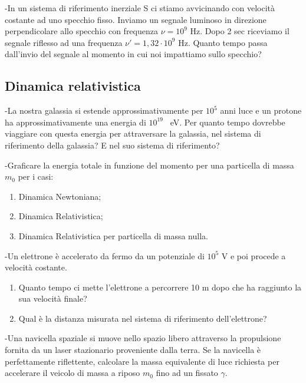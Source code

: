 \documentclass[12pt,twoside,a4]{article}
\begin{document}
\begin{esercizio}
	-In un sistema di riferimento inerziale S ci stiamo avvicinando con velocità  costante ad uno specchio fisso. Inviamo un segnale luminoso in direzione perpendicolare allo specchio con frequenza $\nu = 10^9$ Hz. Dopo 2 sec riceviamo il segnale riflesso ad una frequenza $\nu'=1,32 \cdot 10^9$ Hz. Quanto tempo passa dall'invio del segnale al momento in cui noi impattiamo sullo specchio?
\end{esercizio}

\newpage
\subsection{Dinamica relativistica}

\begin{esercizio}
	-La nostra galassia si estende approssimativamente per $10^5$ anni luce e un protone ha approssimativamente una energia di $10^{19}$ \ eV. Per quanto tempo dovrebbe viaggiare con questa energia per attraversare la galassia, nel sistema di riferimento della galassia? E nel suo sistema di riferimento?
\end{esercizio}

\begin{esercizio}
	-Graficare la energia totale in funzione del momento per una particella di massa $m_0$ per i casi:
	\begin{enumerate}[label=(\textit{\roman*})]
		\item Dinamica Newtoniana;
		\item Dinamica Relativistica;
		\item Dinamica Relativistica per particella di massa nulla.
	\end{enumerate}
\end{esercizio}

\begin{esercizio}
	-Un elettrone è accelerato da fermo da un potenziale di $10^5$ V e poi procede a velocità  costante.
	\begin{enumerate}[label=(\textit{\roman*})]
		\item Quanto tempo ci mette l'elettrone a percorrere 10 m dopo che ha raggiunto la sua velocità  finale?
		\item Qual è la distanza misurata nel sistema di riferimento dell'elettrone?
	\end{enumerate}
\end{esercizio}


\begin{esercizio}
-Una navicella spaziale si muove nello spazio libero attraverso la propulsione fornita da un laser stazionario proveniente dalla terra. Se la navicella è perfettamente riflettente, calcolare la massa equivalente di luce richiesta per accelerare il veicolo di massa a riposo $m_0$ fino ad un fissato $\gamma$.
\end{esercizio}
\end{document}
